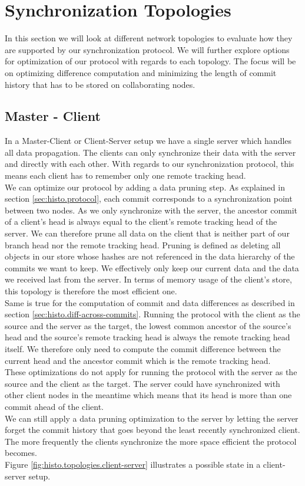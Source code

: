
\section{Synchronization Topologies}
\label{sec:histo.topologies}

In this section we will look at different network topologies to evaluate how they are supported by our synchronization protocol.
We will further explore options for optimization of our protocol with regards to each topology.
The focus will be on optimizing difference computation and minimizing the length of commit history that has to be stored on collaborating nodes.

\subsection{Master - Client}
\label{sec:histo.topologies.master-client}
In a Master-Client or Client-Server setup we have a single server which handles all data propagation.
The clients can only synchronize their data with the server and directly with each other.
With regards to our synchronization protocol, this means each client has to remember only one remote tracking head.\\
We can optimize our protocol by adding a data pruning step.
As explained in section \ref{sec:histo.protocol}, each commit corresponds to a synchronization point between two nodes.
As we only synchronize with the server, the ancestor commit of a client's head is always equal to the client's remote tracking head of the server.
We can therefore prune all data on the client that is neither part of our branch head nor the remote tracking head.
Pruning is defined as deleting all objects in our store whose hashes are not referenced in the data hierarchy of the commits we want to keep.
We effectively only keep our current data and the data we received last from the server.
In terms of memory usage of the client's store, this topology is therefore the most efficient one.\\
Same is true for the computation of commit and data differences as described in section \ref{sec:histo.diff-across-commits}.
Running the protocol with the client as the source and the server as the target, the lowest common ancestor of the source's head and the source's remote tracking head is always the remote tracking head itself.
We therefore only need to compute the commit difference between the current head and the ancestor commit which is the remote tracking head.\\
These optimizations do not apply for running the protocol with the server as the source and the client as the target.
The server could have synchronized with other client nodes in the meantime which means that its head is more than one commit ahead of the client.\\
We can still apply a data pruning optimization to the server by letting the server forget the commit history that goes beyond the least recently synchronized client.
The more frequently the clients synchronize the more space efficient the protocol becomes.\\
Figure \ref{fig:histo.topologies.client-server} illustrates a possible state in a client-server setup.

